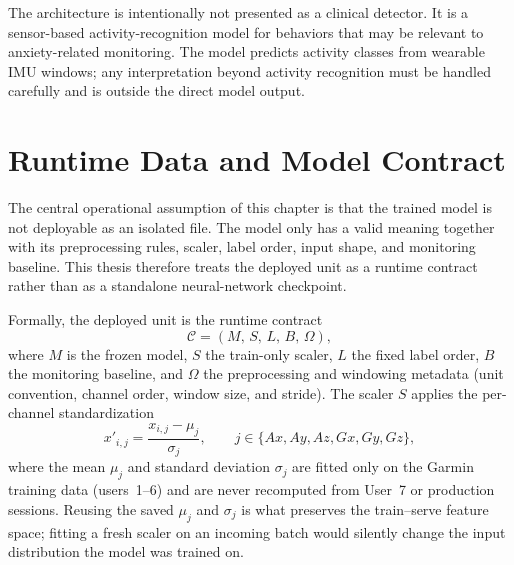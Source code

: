 The architecture is intentionally not presented as a clinical detector. It is a sensor-based activity-recognition model for behaviors that may be relevant to anxiety-related monitoring. The model predicts activity classes from wearable IMU windows; any interpretation beyond activity recognition must be handled carefully and is outside the direct model output.

\section{Runtime Data and Model Contract}
\label{sec:runtime_data_model_contract}

The central operational assumption of this chapter is that the trained model is not deployable as an isolated file. The model only has a valid meaning together with its preprocessing rules, scaler, label order, input shape, and monitoring baseline. This thesis therefore treats the deployed unit as a runtime contract rather than as a standalone neural-network checkpoint.

Formally, the deployed unit is the runtime contract
\[
\mathcal{C}=(M,\,S,\,L,\,B,\,\Omega),
\]
where $M$ is the frozen model, $S$ the train-only scaler, $L$ the fixed label order, $B$ the monitoring baseline, and $\Omega$ the preprocessing and windowing metadata (unit convention, channel order, window size, and stride). The scaler $S$ applies the per-channel standardization
\[
x'_{i,j}=\frac{x_{i,j}-\mu_j}{\sigma_j},\qquad j\in\{Ax,Ay,Az,Gx,Gy,Gz\},
\]
where the mean $\mu_j$ and standard deviation $\sigma_j$ are fitted only on the Garmin training data (users~1--6) and are never recomputed from User~7 or production sessions. Reusing the saved $\mu_j$ and $\sigma_j$ is what preserves the train--serve feature space; fitting a fresh scaler on an incoming batch would silently change the input distribution the model was trained on.

